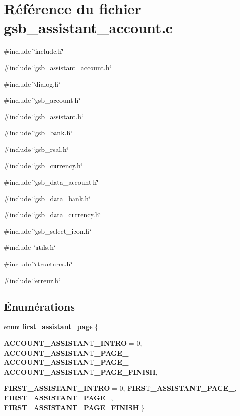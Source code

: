 \section{Référence du fichier gsb\_\-assistant\_\-account.c}
\label{gsb__assistant__account_8c}
{\ttfamily \#include \char`\"{}include.h\char`\"{}}\par
{\ttfamily \#include \char`\"{}gsb\_\-assistant\_\-account.h\char`\"{}}\par
{\ttfamily \#include \char`\"{}dialog.h\char`\"{}}\par
{\ttfamily \#include \char`\"{}gsb\_\-account.h\char`\"{}}\par
{\ttfamily \#include \char`\"{}gsb\_\-assistant.h\char`\"{}}\par
{\ttfamily \#include \char`\"{}gsb\_\-bank.h\char`\"{}}\par
{\ttfamily \#include \char`\"{}gsb\_\-real.h\char`\"{}}\par
{\ttfamily \#include \char`\"{}gsb\_\-currency.h\char`\"{}}\par
{\ttfamily \#include \char`\"{}gsb\_\-data\_\-account.h\char`\"{}}\par
{\ttfamily \#include \char`\"{}gsb\_\-data\_\-bank.h\char`\"{}}\par
{\ttfamily \#include \char`\"{}gsb\_\-data\_\-currency.h\char`\"{}}\par
{\ttfamily \#include \char`\"{}gsb\_\-select\_\-icon.h\char`\"{}}\par
{\ttfamily \#include \char`\"{}utils.h\char`\"{}}\par
{\ttfamily \#include \char`\"{}structures.h\char`\"{}}\par
{\ttfamily \#include \char`\"{}erreur.h\char`\"{}}\par
\subsection*{Énumérations}
\begin{DoxyCompactItemize}
\item 
enum {\bf first\_\-assistant\_\-page} \{ \par
{\bf ACCOUNT\_\-ASSISTANT\_\-INTRO} =  0, 
{\bf ACCOUNT\_\-ASSISTANT\_\-PAGE\_}, 
{\bf ACCOUNT\_\-ASSISTANT\_\-PAGE\_}, 
{\bf ACCOUNT\_\-ASSISTANT\_\-PAGE\_\-FINISH}, 
\par
{\bf FIRST\_\-ASSISTANT\_\-INTRO} =  0, 
{\bf FIRST\_\-ASSISTANT\_\-PAGE\_}, 
{\bf FIRST\_\-ASSISTANT\_\-PAGE\_}, 
{\bf FIRST\_\-ASSISTANT\_\-PAGE\_\-FINISH}
 \}
\end{DoxyCompactItemize}
